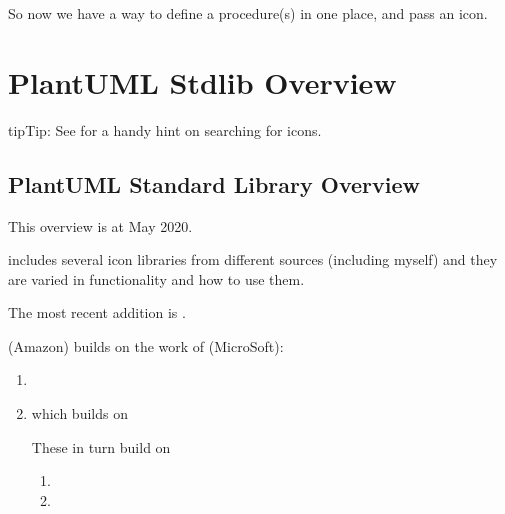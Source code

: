 \documentclass[letterpaper,10pt,english]{sphinxmanual}
\begin{document}
So now we have a way to define a procedure(s) in one place, and pass an icon.


\section{PlantUML Stdlib Overview}
\label{\detokenize{Stdlib/StdLibOverview:plantuml-stdlib-overview}}\label{\detokenize{Stdlib/StdLibOverview::doc}}
\begin{sphinxadmonition}{tip}{Tip:}
See {\hyperref[\detokenize{github/githubFileFinder:githubfilefinder-label}]{}} for a handy hint on searching for icons.
\end{sphinxadmonition}


\subsection{PlantUML Standard Library Overview}
\label{\detokenize{Stdlib/StdLibOverview:plantuml-standard-library-overview}}
This overview is at May 2020.

 includes
several icon libraries from different sources (including myself) and
they are varied in functionality and how to use them.

The most recent addition is
.

 (Amazon) builds on the
work of  (MicroSoft):
\begin{enumerate}
%
\item {} 

\item {} 
 which builds on

These in turn build on
\begin{enumerate}
%
\item {} 

\item {} 

\end{enumerate}

\end{enumerate}
\end{document}
